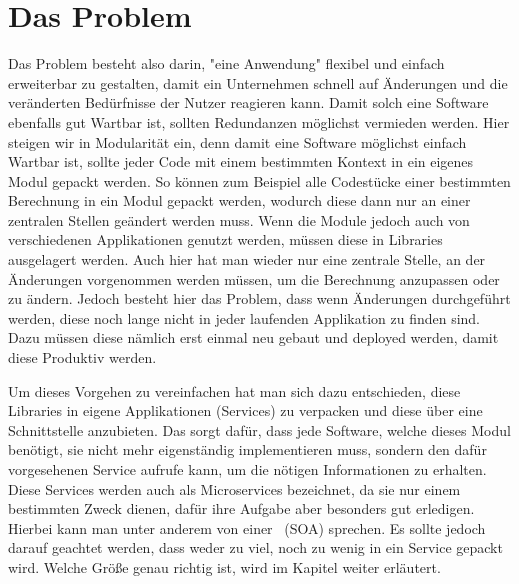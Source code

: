 \section{Das Problem}
\label{sec:dasProblem}
Das Problem besteht also darin, "eine Anwendung" flexibel und einfach erweiterbar zu gestalten, damit ein Unternehmen schnell auf Änderungen und die veränderten Bedürfnisse der Nutzer reagieren kann. Damit solch eine Software ebenfalls gut Wartbar ist, sollten Redundanzen möglichst vermieden werden. Hier steigen wir in Modularität ein, denn damit eine Software möglichst einfach Wartbar ist, sollte jeder Code mit einem bestimmten Kontext in ein eigenes Modul gepackt werden. So können zum Beispiel alle Codestücke einer bestimmten Berechnung in ein Modul gepackt werden, wodurch diese dann nur an einer zentralen Stellen geändert werden muss. Wenn die Module jedoch auch von verschiedenen Applikationen genutzt werden, müssen diese in Libraries ausgelagert werden. Auch hier hat man wieder nur eine zentrale Stelle, an der Änderungen vorgenommen werden müssen, um die Berechnung anzupassen oder zu ändern. Jedoch besteht hier das Problem, dass wenn Änderungen durchgeführt werden, diese noch lange nicht in jeder laufenden Applikation zu finden sind. Dazu müssen diese nämlich erst einmal neu gebaut und deployed werden, damit diese Produktiv werden.

Um dieses Vorgehen zu vereinfachen hat man sich dazu entschieden, diese Libraries in eigene Applikationen (Services) zu verpacken und diese über eine Schnittstelle anzubieten. Das sorgt dafür, dass jede Software, welche dieses Modul benötigt, sie nicht mehr eigenständig implementieren muss, sondern den dafür vorgesehenen Service aufrufe kann, um die nötigen Informationen zu erhalten. Diese Services werden auch als Microservices bezeichnet, da sie nur einem bestimmten Zweck dienen, dafür ihre Aufgabe aber besonders gut erledigen. Hierbei kann man unter anderem von einer \SOA\ (SOA) sprechen. Es sollte jedoch darauf geachtet werden, dass weder zu viel, noch zu wenig in ein Service gepackt wird. Welche Größe genau richtig ist, wird im Kapitel  weiter erläutert.

